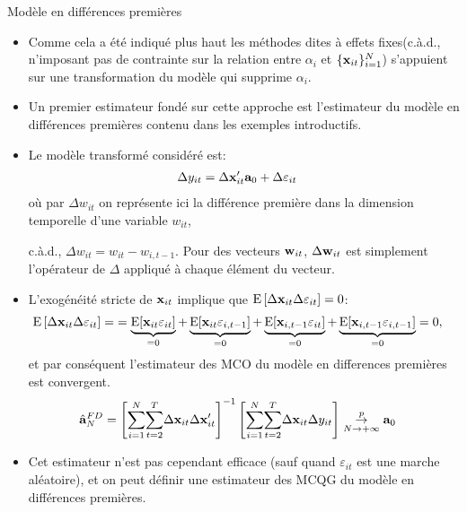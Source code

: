 \begin{frame}[allowframebreaks]{Modèle en différences premières}
    \begin{itemize}
        \item Comme cela a été indiqué plus haut les méthodes dites à effets fixes(c.à.d., 
        n'imposant pas de contrainte sur la relation entre $\alpha_i$ et $\{{\mathbf x}_{it}\}_{i=1}^N$) 
        s'appuient sur une transformation du modèle qui supprime $\alpha_i$. 
        \item Un premier estimateur fondé sur cette approche est l'estimateur du modèle en différences 
        premières contenu dans les exemples introductifs.
        \item  Le modèle transformé considéré est:
        \begin{align*}
        \Delta y_{it} &= \Delta {\mathbf x}_{it}^\prime {\mathbf a}_0 + \Delta \varepsilon_{it}
        \end{align*}
        où par $\Delta w_{it}$ on représente ici
        la différence première dans la dimension temporelle d'une variable $w_{it}$,
        
        c.à.d., $\Delta w_{it} = w_{it}-w_{i, t-1}$. Pour des vecteurs ${\mathbf w}_{it}$, $\Delta{\mathbf w}_{it}$ 
        est simplement l'opérateur de $\Delta$ appliqué à chaque élément du vecteur.

        \item L'exogénéité stricte de ${\mathbf x}_{it}$ implique que $ \operatorname{E}\left[ \Delta {\mathbf x}_{it}  \Delta \varepsilon_{it}\right] = 0$:
        \begin{align*}
        \operatorname{E}\left[\Delta {\mathbf x}_{it}  \Delta \varepsilon_{it}\right] =&=\underbrace{\operatorname{E}[{\mathbf x}_{it} \varepsilon_{it}]}_{=0} 
        + \underbrace{\operatorname{E}[{\mathbf x}_{it} \varepsilon_{i, t-1}]}_{=0} + \underbrace{\operatorname{E}[{\mathbf x}_{i, t-1} \varepsilon_{it}]}_{=0}  +  
        \underbrace{\operatorname{E}[{\mathbf x}_{i, t-1} \varepsilon_{i, t-1}]}_{=0}=0,
        \end{align*}
        et par conséquent l'estimateur des MCO du modèle en differences premières est convergent.
        \begin{align*}
        \hat{{\mathbf a}}^{FD}_N = 
        \left[{\sum_{i=1}^N} \underset{t=2}{\overset{T}{\sum}}\Delta {\mathbf x}_{it} \Delta {\mathbf x}_{it}^\prime\right]^{-1}
        \left[{\sum_{i=1}^N} \underset{t=2}{\overset{T}{\sum}}\Delta {\mathbf x}_{it} \Delta y_{it}\right] &\underset{N{\rightarrow} +\infty}{\overset{p}{\rightarrow}} {\mathbf a}_0
        \end{align*}
        \item Cet estimateur n'est pas cependant efficace (sauf quand $\varepsilon_{it}$ est une marche aléatoire), 
        et on peut définir une estimateur des MCQG du modèle en différences premières.
    \end{itemize}
\end{frame}

